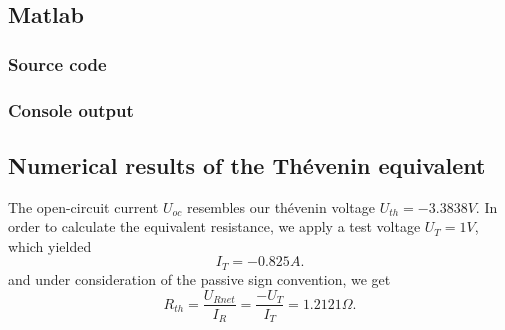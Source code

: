 \documentclass[a4paper]{article}
\begin{document}
\subsection{Matlab}
\subsubsection{Source code}
  
\subsubsection{Console output}
  

\subsection{Numerical results of the Thévenin equivalent}
The open-circuit current $U_{oc}$ resembles our thévenin voltage $U_{th} = -3.3838 V$.
In order to calculate the equivalent resistance, we apply a test voltage $U_{T} = 1V$, which yielded
\[
I_{T} = -0.825A
.\] 
and under consideration of the passive sign convention, we get
\[
R_{th} = \frac{U_{Rnet}}{I_{R}} = \frac{-U_{T}}{I_{T}}= 1.2121\Omega
.\]
\clearpage
\end{document}
